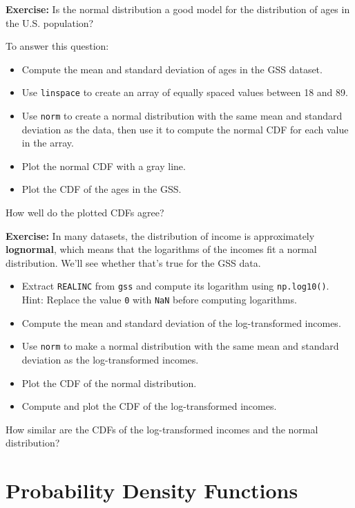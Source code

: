 \textbf{Exercise:} Is the normal distribution a good model for the
distribution of ages in the U.S. population?

To answer this question:

\begin{itemize}
\item
  Compute the mean and standard deviation of ages in the GSS dataset.
\item
  Use \passthrough{\lstinline!linspace!} to create an array of equally
  spaced values between 18 and 89.
\item
  Use \passthrough{\lstinline!norm!} to create a normal distribution
  with the same mean and standard deviation as the data, then use it to
  compute the normal CDF for each value in the array.
\item
  Plot the normal CDF with a gray line.
\item
  Plot the CDF of the ages in the GSS.
\end{itemize}

How well do the plotted CDFs agree?

\textbf{Exercise:} In many datasets, the distribution of income is
approximately \textbf{lognormal}, which means that the logarithms of the
incomes fit a normal distribution. We'll see whether that's true for the
GSS data.

\begin{itemize}
\item
  Extract \passthrough{\lstinline!REALINC!} from
  \passthrough{\lstinline!gss!} and compute its logarithm using
  \passthrough{\lstinline!np.log10()!}. Hint: Replace the value
  \passthrough{\lstinline!0!} with \passthrough{\lstinline!NaN!} before
  computing logarithms.
\item
  Compute the mean and standard deviation of the log-transformed
  incomes.
\item
  Use \passthrough{\lstinline!norm!} to make a normal distribution with
  the same mean and standard deviation as the log-transformed incomes.
\item
  Plot the CDF of the normal distribution.
\item
  Compute and plot the CDF of the log-transformed incomes.
\end{itemize}

How similar are the CDFs of the log-transformed incomes and the normal
distribution?

\hypertarget{probability-density-functions}{%
\section{Probability Density
Functions}\label{probability-density-functions}}

